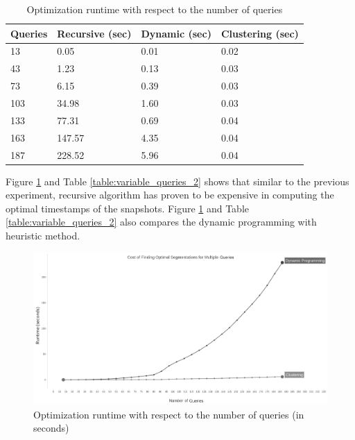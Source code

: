 			\begin {center}
			\begin{table}
				\centering
				\caption{Optimization runtime with respect to the number of queries}
				\label {table:variable_queries}
				\begin{tabular}{p{2cm}p{3cm}p{3cm}p{3cm}}
					\hline
					Queries & Recursive (sec)   & Dynamic (sec)  & Clustering (sec) \\ \hline
					13 & 0.05   & 0.01  & 0.02  \\  
					43 & 1.23   & 0.13  & 0.03  \\
					73 & 6.15   & 0.39  & 0.03  \\
					103 & 34.98 & 1.60  & 0.03  \\
					133 & 77.31 & 0.69  & 0.04 \\
					163 & 147.57 & 4.35  & 0.04  \\
					187 & 228.52 & 5.96  & 0.04  \\\hline
				\end{tabular}
			\end{table}
			\end{center}

			Figure \ref{fig:variable_queries_2} and Table \ref{table:variable_queries_2} shows that similar to the previous experiment, recursive algorithm has proven to be expensive in computing the optimal timestamps of the snapshots. Figure \ref{fig:variable_queries_2} and Table \ref{table:variable_queries_2} also compares the dynamic programming with heuristic method.

			\begin{figure}
				\centering
				\includegraphics[width=\textwidth, scale=0.5]{figs/multi_query_2.jpg}
				\caption{Optimization runtime with respect to the number of queries (in seconds)}
				\label{fig:variable_queries_2}
			\end{figure} 


